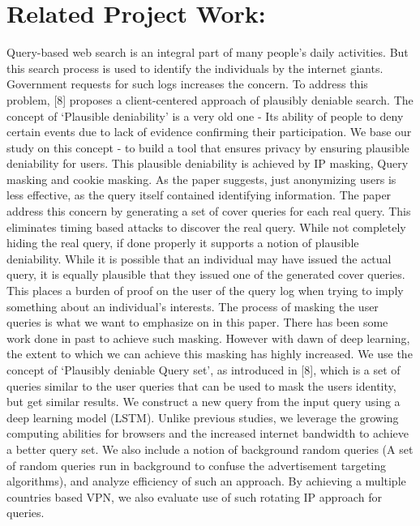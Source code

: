 \documentclass[11pt]{article}
\begin{document}
\section {Related Project Work:}
Query-based web search is an integral part of many people’s daily activities. But this search process is used to identify the individuals by the internet giants. Government requests for such logs increases the concern. To address this problem, [8] proposes a client-centered approach of plausibly deniable search. The concept of ‘Plausible deniability’ is a very old one - Its ability of people to deny certain events due to lack of evidence confirming their participation. We base our study on this concept - to build a tool that ensures privacy by ensuring plausible deniability for users. This plausible deniability is achieved by IP masking, Query masking and cookie masking. As the paper suggests, just anonymizing users is less effective, as the query itself contained identifying information. The paper address this concern by generating a set of cover queries for each real query. This eliminates timing based attacks to discover the real query. While not completely hiding the real query, if done properly it supports a notion of plausible deniability. While it is possible that an individual may have issued the actual query, it is equally plausible that they issued one of the generated cover queries. This places a burden of proof on the user of the query log when trying to imply something about an individual’s interests. The process of masking the user queries is what we want to emphasize on in this paper. There has been some work done in past to achieve such masking. However with dawn of deep learning, the extent to which we can achieve this masking has highly increased. We use the concept of ‘Plausibly deniable Query set’, as introduced in [8], which is a set of queries similar to the user queries that can be used to mask the users identity, but get similar results. We construct a new query from the input query using a deep learning model (LSTM). Unlike previous studies, we leverage the growing computing abilities for browsers and the increased internet bandwidth to achieve a better query set. We also include a notion of background random queries (A set of random queries run in background to confuse the advertisement targeting algorithms), and analyze efficiency of such an approach. By achieving a multiple countries based VPN, we also evaluate use of such rotating IP approach for queries.
\newline\newline
\end{document}
